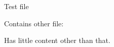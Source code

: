 \documentclass{article}
\begin{document}
Test file

Contains other file:


Has little content other than that.
\printindex
\end{document}
